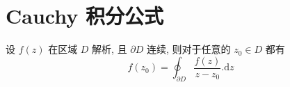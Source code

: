     \section{Cauchy 积分公式}
        \begin{theorem}
            设 $f\left(z\right)$ 在区域 $D$ 解析, 且 $\partial D$ 连续, 则对于任意的 $z_0\in D$ 都有
            $$
            f\left(z_0\right) = \oint_{\partial D}{\dfrac{f\left(z\right)}{z-z_0}.\mathrm{d}z}
            $$
        \end{theorem}